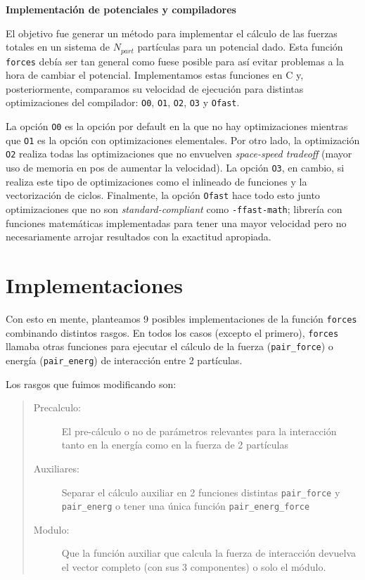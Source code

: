 \documentclass[twoside, 12pt]{article}
\begin{document}
\begin{center}
{\fontsize{20pt}{10pt}\textbf{Implementación de potenciales y compiladores}}
\end{center}

El objetivo fue generar un método para implementar el cálculo de las fuerzas totales en un sistema de $N_{part}$ partículas para un potencial dado. Esta función \texttt{forces} debía ser tan general como fuese posible para así evitar problemas a la hora de cambiar el potencial. Implementamos estas funciones en C y, posteriormente, comparamos su velocidad de ejecución para distintas optimizaciones del compilador: \texttt{O0}, \texttt{O1}, \texttt{O2}, \texttt{O3} y \texttt{Ofast}. 

La opción \texttt{O0} es la opción por default en la que no hay optimizaciones mientras que \texttt{O1} es la opción con optimizaciones elementales. Por otro lado, la optimización \texttt{O2} realiza todas las optimizaciones que no envuelven \textit{space-speed tradeoff} (mayor uso de memoria en pos de aumentar la velocidad). La opción \texttt{O3}, en cambio, si realiza este tipo de optimizaciones como el inlineado de funciones y la vectorización de ciclos. Finalmente, la opción \texttt{Ofast} hace todo esto junto optimizaciones que no son \textit{standard-compliant} como \texttt{-ffast-math}; librería con funciones matemáticas implementadas para tener una mayor velocidad pero no necesariamente arrojar resultados con la exactitud apropiada. 

\section{Implementaciones}
Con esto en mente, planteamos 9 posibles implementaciones de la función \texttt{forces} combinando distintos rasgos. En todos los casos (excepto el primero), \texttt{forces} llamaba otras funciones para ejecutar el cálculo de la fuerza (\texttt{pair\_force}) o energía (\texttt{pair\_energ}) de interacción entre 2 partículas. 

Los rasgos que fuimos modificando son: 

\begin{quote}
\begin{description}
\item[Precalculo:] El pre-cálculo o no de parámetros relevantes para la interacción tanto en la energía como en la fuerza de 2 partículas

\item[Auxiliares:] Separar el cálculo auxiliar en 2 funciones distintas \texttt{pair\_force} y \texttt{pair\_energ} o tener una única función \texttt{pair\_energ\_force}

\item[Modulo:] Que la función auxiliar que calcula la fuerza de interacción devuelva el vector completo (con sus 3 componentes) o solo el módulo.
\end{description}
\end{quote}
\end{document}
